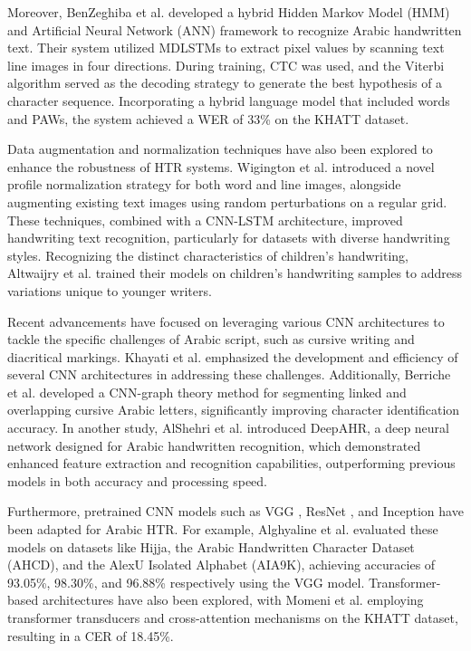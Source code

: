 \documentclass[conference]{IEEEtran}
\begin{document}
Moreover, BenZeghiba et al. \cite{benzeghiba2015hybrid} developed a hybrid Hidden Markov Model (HMM) and Artificial Neural Network (ANN) framework to recognize Arabic handwritten text. Their system utilized MDLSTMs to extract pixel values by scanning text line images in four directions. During training, CTC was used, and the Viterbi algorithm served as the decoding strategy to generate the best hypothesis of a character sequence. Incorporating a hybrid language model that included words and PAWs, the system achieved a WER of 33\% on the KHATT dataset.

Data augmentation and normalization techniques have also been explored to enhance the robustness of HTR systems. Wigington et al. \cite{wigington2017data} introduced a novel profile normalization strategy for both word and line images, alongside augmenting existing text images using random perturbations on a regular grid. These techniques, combined with a CNN-LSTM architecture, improved handwriting text recognition, particularly for datasets with diverse handwriting styles. Recognizing the distinct characteristics of children's handwriting, Altwaijry et al. \cite{altwaijry2021arabic} trained their models on children's handwriting samples to address variations unique to younger writers.


Recent advancements have focused on leveraging various CNN architectures to tackle the specific challenges of Arabic script, such as cursive writing and diacritical markings. Khayati et al. \cite{el2024cnn} emphasized the development and efficiency of several CNN architectures in addressing these challenges. Additionally, Berriche et al. \cite{berriche2024hybrid} developed a CNN-graph theory method for segmenting linked and overlapping cursive Arabic letters, significantly improving character identification accuracy. In another study, AlShehri et al. \cite{alshehri2024deepahr} introduced DeepAHR, a deep neural network designed for Arabic handwritten recognition, which demonstrated enhanced feature extraction and recognition capabilities, outperforming previous models in both accuracy and processing speed.

Furthermore, pretrained CNN models such as VGG \cite{VGG}, ResNet \cite{Resnet}, and Inception \cite{Inception} have been adapted for Arabic HTR. For example, Alghyaline et al. \cite{alghyalineoptimised} evaluated these models on datasets like Hijja, the Arabic Handwritten Character Dataset (AHCD), and the AlexU Isolated Alphabet (AIA9K), achieving accuracies of 93.05\%, 98.30\%, and 96.88\% respectively using the VGG model. Transformer-based architectures have also been explored, with Momeni et al. \cite{momeni2024transformer} employing transformer transducers and cross-attention mechanisms on the KHATT dataset, resulting in a CER of 18.45\%.
\end{document}
